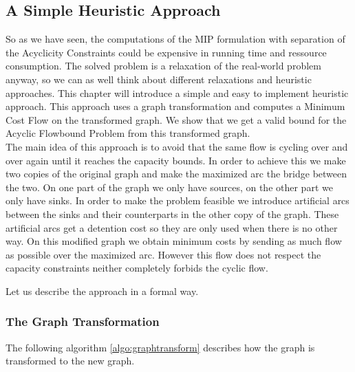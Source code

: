 \newpage
\subsection{A Simple Heuristic Approach}

So as we have seen, the computations of the MIP formulation with separation of the Acyclicity Constraints could be 
expensive in running time and ressource consumption. The solved problem is a relaxation of the real-world 
problem anyway, so we can as well think 
about different relaxations and heuristic approaches. This chapter will introduce a simple and easy to 
implement heuristic approach. This approach uses a graph transformation and computes a Minimum Cost Flow on the 
transformed graph. We show that we get a valid bound for the Acyclic Flowbound Problem from this transformed graph.\\

The main idea of this approach is to avoid that the same flow is cycling over and over again until it reaches the 
capacity bounds. In order to achieve this we make two copies of the original graph and make the maximized arc the 
bridge between the two. On one part of the graph we only have sources, on the other part we only have sinks. 
In order to make the problem feasible we introduce artificial arcs between the sinks and their counterparts in the other 
copy of the graph. These artificial arcs get a detention cost so they are only used when there is no other way. On this 
modified graph we obtain minimum costs by sending as much flow as possible over the maximized arc. However this flow 
does not respect the capacity constraints neither completely forbids the cyclic flow. 

Let us describe the approach in a formal way.

\subsubsection*{The Graph Transformation}

The following algorithm \ref{algo:graphtransform} describes how the graph is transformed to the new graph.

